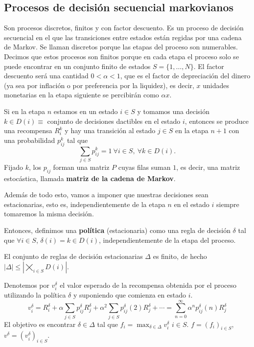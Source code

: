 \documentclass[MIOP.tex]{subfiles}
\begin{document}
\subsection{Procesos de decisión secuencial markovianos}
Son procesos discretos, finitos y con factor descuento. Es un proceso de decisión secuencial en el que las transiciones entre estados están regidas por una cadena de Markov. Se llaman discretos porque las etapas del proceso son numerables. Decimos que estos procesos son finitos porque en cada etapa el proceso solo se puede encontrar en un conjunto finito de estados $S=\{1,\dots, N\}$. El factor descuento será una cantidad $0<\alpha <1$, que es el factor de depreciación del dinero (ya sea por inflación o por preferencia por la liquidez), es decir, $x$ unidades monetarias en la etapa siguiente se percibirán como $\alpha x$. 

Si en la etapa $n$ estamos en un estado $i\in S$ y tomamos una decisión $k\in D(i)\equiv$ conjunto de decisiones dactibles en el estado $i$, entonces se produce una recompensa $R^k_i$ y hay una transición al estado $j\in S$ en la etapa $n+1$ con una probabilidad $p_{ij}^k$ tal que 
$$\sum_{j\in S}p_{ij}^k=1\ \forall i\in S,\ \forall k\in D(i).$$
Fijado $k$, los $p_{ij}$ forman una matriz $P$ cuyas filas suman $1$, es decir, una matriz estocástica, llamada \textbf{matriz de la cadena de Markov}.

Además de todo esto, vamos a imponer que nuestras decisiones sean estacionarias, esto es, independientemente de la etapa $n$ en el estado $i$ siempre tomaremos la misma decisión. 

Entonces, definimos una \textbf{política} (estacionaria) como una regla de decisión $\delta$ tal que $\forall i\in S$, $\delta(i)=k\in D(i)$, independientemente de la etapa del proceso.

El conjunto de reglas de decisión estacionarias $\Delta$ es finito, de hecho $|\Delta|\leq |\bigtimes_{i\in S} D(i)|$.  

Denotemos por $v^\delta_i$ el valor esperado de la recompensa obtenida por el proceso utilizando la política $\delta$ y suponiendo que comienza en estado $i$. 
$$v^\delta_i=R^\delta_i+\alpha\sum_{j\in S} p_{ij}^\delta R_j^\delta +\alpha^2\sum_{j\in S}p_{ij}^\delta(2)R_j^\delta+\cdots=\sum_{n=0}^\infty\alpha^n p_{ij}^\delta(n) R_j^\delta$$
El objetivo es encontrar $\delta\in\Delta$ tal que $f_i=\max_{\delta\in\Delta}v_i^\delta$ $i\in S$. $f=(f_i)_{i\in S}$, $v^\delta=(v_i^\delta)_{i\in S}$.
\end{document}
